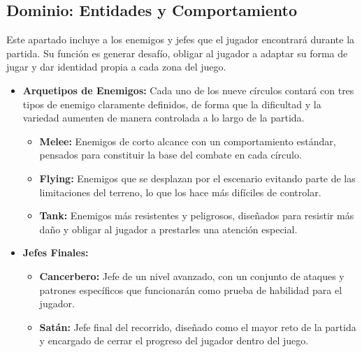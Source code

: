 \subsection{Dominio: Entidades y Comportamiento}
Este apartado incluye a los enemigos y jefes que el jugador encontrará durante la partida. 
Su función es generar desafío, obligar al jugador a adaptar su forma de jugar y dar identidad 
propia a cada zona del juego.
\begin{itemize}
    \item \textbf{Arquetipos de Enemigos:} Cada uno de los nueve círculos contará con tres 
    tipos de enemigo claramente definidos, de forma que la dificultad y la variedad aumenten 
    de manera controlada a lo largo de la partida.
    \begin{itemize}
        \item \textbf{Melee:} Enemigos de corto alcance con un comportamiento estándar, 
        pensados para constituir la base del combate en cada círculo.
        \item \textbf{Flying:} Enemigos que se desplazan por el escenario evitando parte de 
        las limitaciones del terreno, lo que los hace más difíciles de controlar.
        \item \textbf{Tank:} Enemigos más resistentes y peligrosos, diseñados para resistir 
        más daño y obligar al jugador a prestarles una atención especial.
    \end{itemize}
    \item \textbf{Jefes Finales:}
    \begin{itemize}
        \item \textbf{Cancerbero:} Jefe de un nivel avanzado, con un conjunto de ataques y 
        patrones específicos que funcionarán como prueba de habilidad para el jugador.
        \item \textbf{Satán:} Jefe final del recorrido, diseñado como el mayor reto de la partida 
        y encargado de cerrar el progreso del jugador dentro del juego.
    \end{itemize}
\end{itemize}

